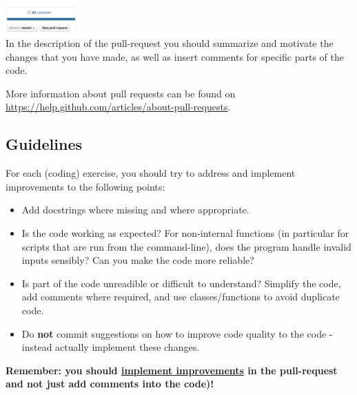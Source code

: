 \documentclass[a4paper]{article}
\begin{document}
\begin{enumerate}
\\
\includegraphics[width=0.2\textwidth]{Selection_006}
\\
In the description of the pull-request you should summarize and motivate the changes that you have made, as well as insert comments for specific parts of the code.
\end{enumerate}


More information about pull requests can be found on \url{https://help.github.com/articles/about-pull-requests}.


\subsection{Guidelines}\label{sec:general_review}
For each (coding) exercise, you should try to address and implement improvements to the following points:

\begin{itemize}
  \item Add docstrings where missing and where appropriate.
  \item Is the code working as expected? For non-internal functions (in particular for scripts that are run from the command-line), does the program handle invalid inputs sensibly? Can you make the code more reliable?
  \item Is part of the code unreadible or difficult to understand? Simplify the code, add comments where required, and use classes/functions to avoid duplicate code. 
\item Do \textbf{not} commit suggestions on how to improve code quality to the code - instead actually implement these changes. 
\end{itemize}

\textbf{Remember: you should \underline{implement improvements} in the pull-request and not just add comments into the code)!}


\end{document}
